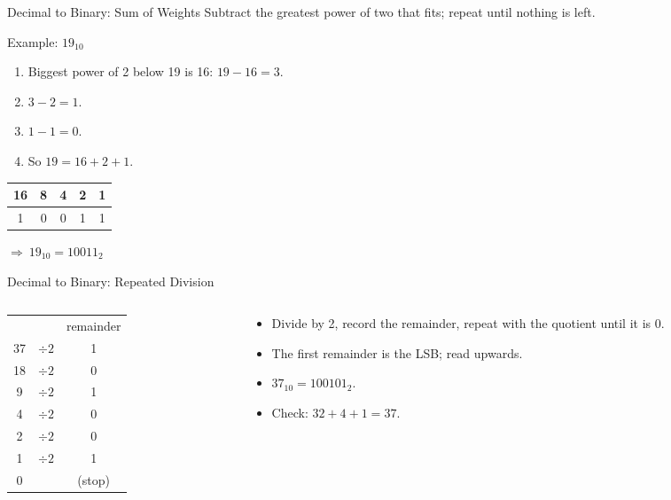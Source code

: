 \documentclass[9pt,aspectratio=169,xcolor=table]{beamer}
\begin{document}
\begin{frame}{Decimal to Binary: Sum of Weights}
  Subtract the greatest power of two that fits; repeat until nothing is left.
  \begin{block}{Example: $19_{10}$}
    \begin{enumerate}\small\itemsep1pt
      \item Biggest power of 2 below 19 is 16: $19 - 16 = 3$.
      \item $3 - 2 = 1$.
      \item $1 - 1 = 0$.
      \item So $19 = 16 + 2 + 1$.
    \end{enumerate}
    \centering
    \begin{tabular}{|c|c|c|c|c|}
      \hline
      16 & 8 & 4 & 2 & 1 \\ \hline
      1 & 0 & 0 & 1 & 1 \\ \hline
    \end{tabular}
    \quad $\Rightarrow\ 19_{10} = 10011_2$
  \end{block}
\end{frame}

\begin{frame}{Decimal to Binary: Repeated Division}
  \begin{columns}[c]
  \begin{column}{.38\textwidth}
    \centering
    \begin{tabular}{c|rc}
      \multicolumn{2}{c}{} & remainder \\
      37 & $\div2$ & 1 \\ \cline{1-2}
      18 & $\div2$ & 0 \\ \cline{1-2}
       9 & $\div2$ & 1 \\ \cline{1-2}
       4 & $\div2$ & 0 \\ \cline{1-2}
       2 & $\div2$ & 0 \\ \cline{1-2}
       1 & $\div2$ & 1 \\ \cline{1-2}
       0 & & (stop) \\
    \end{tabular}
  \end{column}
  \begin{column}{.58\textwidth}
    \begin{itemize}
      \item Divide by 2, record the remainder, repeat with the quotient until it is 0.
      \item The \alert{first} remainder is the LSB; read upwards.
      \item $37_{10} = 100101_2$.
      \item Check: $32 + 4 + 1 = 37$.
    \end{itemize}
  \end{column}
  \end{columns}
\end{frame}
\end{document}
